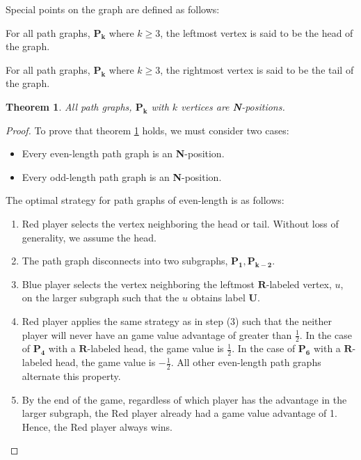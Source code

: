 \documentclass{sig-alternate}
\newtheorem{theorem}{Theorem}
\newcommand\npos[0]{\textbf{N}}
\begin{document}
	Special points on the graph are defined as follows:
	\begin{defn}
		For all path graphs, $\mathbf{P_k}$ where $k \geq 3$, the leftmost vertex
		is said to be the head of the graph.
	\end{defn}
	\begin{defn}
		For all path graphs, $\mathbf{P_k}$ where $k \geq 3$, the rightmost vertex
		is said to be the tail of the graph.
	\end{defn}

	\begin{theorem}
		\label{thm:path}
		All path graphs, $\mathbf{P_k}$ with $k$ vertices are \npos-positions.
	\end{theorem}

	\begin{proof}
		To prove that theorem \ref{thm:path} holds, we must consider two cases:
		\begin{itemize}
			\item Every even-length path graph is an \npos-position.
			\item Every odd-length path graph is an \npos-position.
		\end{itemize}

		\begin{case}
		The optimal strategy for path graphs of even-length is as follows:
		\begin{enumerate}
			\item Red player selects the vertex neighboring the head or tail.
				Without loss of generality, we assume the head.
			\item The path graph disconnects into two subgraphs, $\mathbf{P_1},
				\mathbf{P_{k-2}}$.
			\item Blue player selects the vertex neighboring the leftmost
				$\mathbf{R}$-labeled vertex, $u$, on the larger subgraph such that the
				$u$ obtains label $\mathbf{U}$.
			\item Red player applies the same strategy as in step (3) such that
				the neither player will never have an game value advantage of
				greater than $\frac{1}{2}$. In the case of $\mathbf{P_4}$ with
				a $\mathbf{R}$-labeled head, the game value is $\frac{1}{2}$.
				In the case of $\mathbf{P_6}$ with a $\mathbf{R}$-labeled head,
				the game value is $-\frac{1}{2}$. All other even-length path
				graphs alternate this property.
			\item By the end of the game, regardless of which player has the advantage
				in the larger subgraph, the Red player already had a game value
				advantage of 1. Hence, the Red player always wins.
		\end{enumerate}
		\end{case}


\end{proof}
\end{document}
